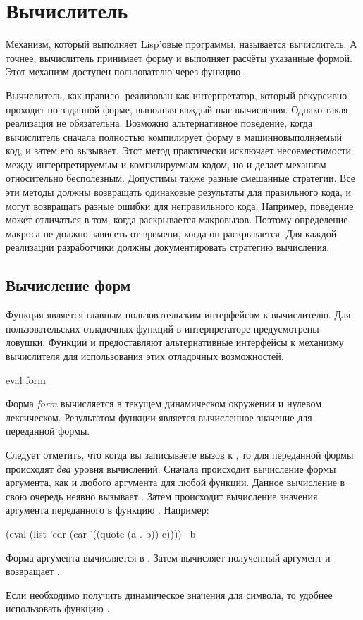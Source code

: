 \else

\chapter{Вычислитель}

Механизм, который выполняет Lisp'овые программы, называется вычислитель.
А точнее, вычислитель принимает форму и выполняет расчёты указанные формой.
Этот механизм доступен пользователю через функцию .

Вычислитель, как правило, реализован как интерпретатор, который рекурсивно
проходит по заданной форме, выполняя каждый шаг вычисления. Однако такая
реализация не обязательна. Возможно альтернативное поведение, когда вычислитель
сначала полностью компилирует форму в машинновыполняемый код, и затем его
вызывает.
Этот метод практически исключает несовместимости между интерпретируемым и
компилируемым кодом, но и делает механизм  относительно
бесполезным.
Допустимы также разные смешанные стратегии. Все эти методы должны возвращать
одинаковые результаты для правильного кода, и могут возвращать разные ошибки для
неправильного кода.
Например, поведение может отличаться в том, когда раскрывается
макровызов. Поэтому определение макроса не должно зависеть от времени, когда он
раскрывается. Для каждой реализации разработчики должны документировать
стратегию вычисления. 

\section{Вычисление форм}

Функция  является главным пользовательским интерфейсом к вычислителю.
Для пользовательских отладочных функций в интерпретаторе предусмотрены ловушки. 
Функции  и  предоставляют альтернативные интерфейсы
к механизму вычислителя для использования этих отладочных возможностей.

\begin{defun}[Function]
eval form

Форма \emph{form} вычисляется в текущем динамическом окружении и нулевом
лексическом. Результатом функции является вычисленное значение для переданной
формы.

Следует отметить, что когда вы записываете вызов к , то для переданной
формы происходят \emph{два} уровня вычислений.
Сначала происходит вычисление формы аргумента, как и любого аргумента для любой
функции. Данное вычисление в свою очередь неявно вызывает .
Затем происходит вычисление значения аргумента переданного в функцию .
Например:
\begin{lisp}
(eval (list 'cdr (car '((quote (a . b)) c)))) \EV\ b
\end{lisp}
Форма аргумента  вычисляется в
.
Затем  вычисляет полученный аргумент и возвращает .

Если необходимо получить динамическое значения для символа, то удобнее
использовать функцию .
\end{defun}

